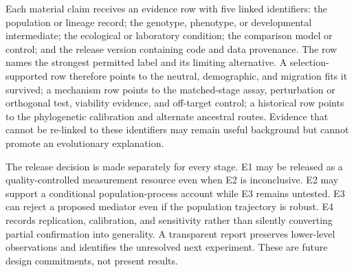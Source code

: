 \documentclass[conference]{IEEEtran}
\begin{document}
Each material claim receives an evidence row with five linked identifiers: the population or lineage record; the genotype, phenotype, or developmental intermediate; the ecological or laboratory condition; the comparison model or control; and the release version containing code and data provenance. The row names the strongest permitted label and its limiting alternative. A selection-supported row therefore points to the neutral, demographic, and migration fits it survived; a mechanism row points to the matched-stage assay, perturbation or orthogonal test, viability evidence, and off-target control; a historical row points to the phylogenetic calibration and alternate ancestral routes. Evidence that cannot be re-linked to these identifiers may remain useful background but cannot promote an evolutionary explanation.

The release decision is made separately for every stage. E1 may be released as a quality-controlled measurement resource even when E2 is inconclusive. E2 may support a conditional population-process account while E3 remains untested. E3 can reject a proposed mediator even if the population trajectory is robust. E4 records replication, calibration, and sensitivity rather than silently converting partial confirmation into generality. A transparent report preserves lower-level observations and identifies the unresolved next experiment. These are future design commitments, not present results.
\end{document}
